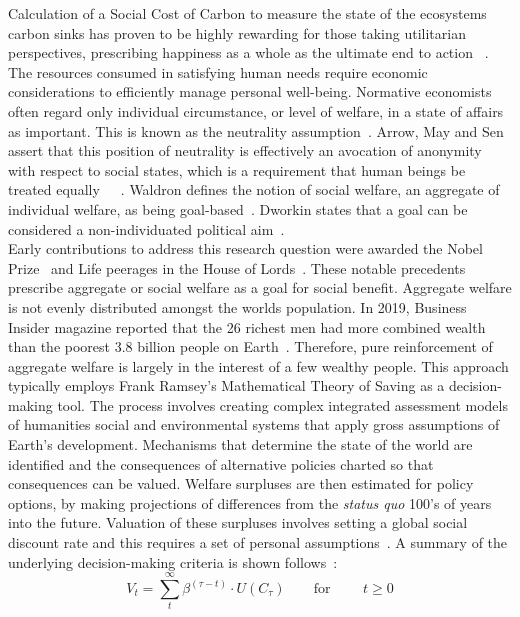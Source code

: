 \documentclass[11pt, oneside]{article}   	%
\begin{document}
Calculation of a Social Cost of Carbon to measure the state of the ecosystems carbon sinks has proven to be highly rewarding for those taking utilitarian perspectives, prescribing happiness as a whole as the ultimate end to action ~\cite{hs1}.
The resources consumed in satisfying human needs require economic considerations to efficiently manage personal well-being. Normative economists often regard only individual circumstance, or level of  welfare, in a state of affairs as important.
This is known as the neutrality assumption~\cite{pd2}.
Arrow, May and Sen assert that this position of neutrality is effectively an avocation of anonymity with respect to social states, which is a requirement that human beings be treated equally~\cite{ka1}~\cite{km1}~\cite{as2}.
Waldron defines the notion of social welfare, an aggregate of individual welfare, as being goal-based~\cite{jw2}.
Dworkin states that a goal can be considered a non-individuated political aim~\cite{rd1}.\\

Early contributions to address this research question were awarded the Nobel Prize~\cite{np1} and Life peerages in the House of Lords~\cite{g1}.
These notable precedents prescribe aggregate or social welfare as a goal for social benefit.
Aggregate welfare is not evenly distributed amongst the worlds population.
In 2019, Business Insider magazine reported that the 26 richest men had more combined wealth than the poorest 3.8 billion people on Earth~\cite{bi1}.
Therefore, pure reinforcement of aggregate welfare is largely in the interest of a few wealthy people.
This approach typically employs Frank Ramsey's Mathematical Theory of Saving as a decision-making tool.
The process involves creating complex integrated assessment models of humanities social and environmental systems that apply gross assumptions of Earth's development.
Mechanisms that determine the state of the world are identified and the consequences of alternative policies charted so that consequences can be valued.
Welfare surpluses are then estimated for policy options, by making projections of differences from the \emph{status quo} 100's of years into the future.
Valuation of these surpluses involves setting a global social discount rate and this requires a set of personal assumptions~\cite{pd2}.
A summary of the underlying decision-making criteria is shown follows~\cite{fr1}:\\

\begin{equation}
V_t = \sum_t^\infty \beta^{(\tau - t)} \cdot U (C_\tau)
\qquad \text{for }
\qquad t \geq 0
\end{equation}
\end{document}
